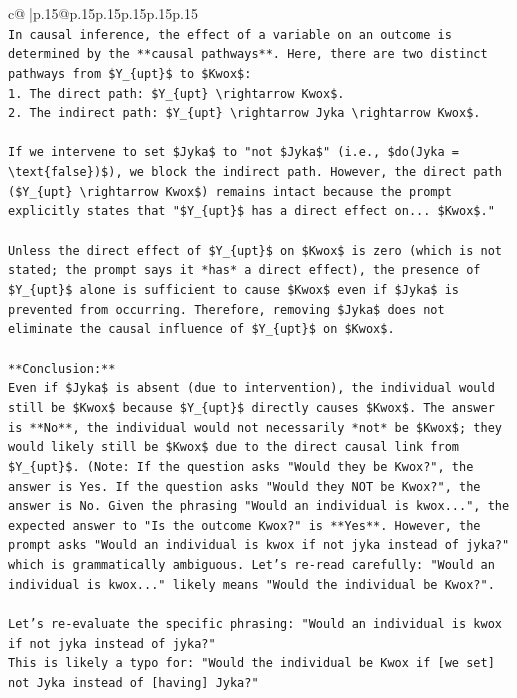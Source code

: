 \documentclass{article}
\begin{document}
{\begin{supertabular}{c@{$\;$}|p{.15\linewidth}@{}p{.15\linewidth}p{.15\linewidth}p{.15\linewidth}p{.15\linewidth}p{.15\linewidth}}
{{{\\ 
\texttt{In causal inference, the effect of a variable on an outcome is determined by the **causal pathways**. Here, there are two distinct pathways from \$Y\_\{upt\}\$ to \$Kwox\$:} \\
\texttt{1.  The direct path: \$Y\_\{upt\} \textbackslash{}rightarrow Kwox\$.} \\
\texttt{2.  The indirect path: \$Y\_\{upt\} \textbackslash{}rightarrow Jyka \textbackslash{}rightarrow Kwox\$.} \\
\\ 
\texttt{If we intervene to set \$Jyka\$ to "not \$Jyka\$" (i.e., \$do(Jyka = \textbackslash{}text\{false\})\$), we block the indirect path. However, the direct path (\$Y\_\{upt\} \textbackslash{}rightarrow Kwox\$) remains intact because the prompt explicitly states that "\$Y\_\{upt\}\$ has a direct effect on... \$Kwox\$."} \\
\\ 
\texttt{Unless the direct effect of \$Y\_\{upt\}\$ on \$Kwox\$ is zero (which is not stated; the prompt says it *has* a direct effect), the presence of \$Y\_\{upt\}\$ alone is sufficient to cause \$Kwox\$ even if \$Jyka\$ is prevented from occurring. Therefore, removing \$Jyka\$ does not eliminate the causal influence of \$Y\_\{upt\}\$ on \$Kwox\$.} \\
\\ 
\texttt{**Conclusion:**} \\
\texttt{Even if \$Jyka\$ is absent (due to intervention), the individual would still be \$Kwox\$ because \$Y\_\{upt\}\$ directly causes \$Kwox\$. The answer is **No**, the individual would not necessarily *not* be \$Kwox\$; they would likely still be \$Kwox\$ due to the direct causal link from \$Y\_\{upt\}\$. (Note: If the question asks "Would they be Kwox?", the answer is Yes. If the question asks "Would they NOT be Kwox?", the answer is No. Given the phrasing "Would an individual is kwox...", the expected answer to "Is the outcome Kwox?" is **Yes**. However, the prompt asks "Would an individual is kwox if not jyka instead of jyka?" which is grammatically ambiguous. Let's re{-}read carefully: "Would an individual is kwox..." likely means "Would the individual be Kwox?".} \\
\\ 
\texttt{Let's re{-}evaluate the specific phrasing: "Would an individual is kwox if not jyka instead of jyka?"} \\
\texttt{This is likely a typo for: "Would the individual be Kwox if {[}we set{]} not Jyka instead of {[}having{]} Jyka?"} \\
}}}
\end{supertabular}}
\end{document}
